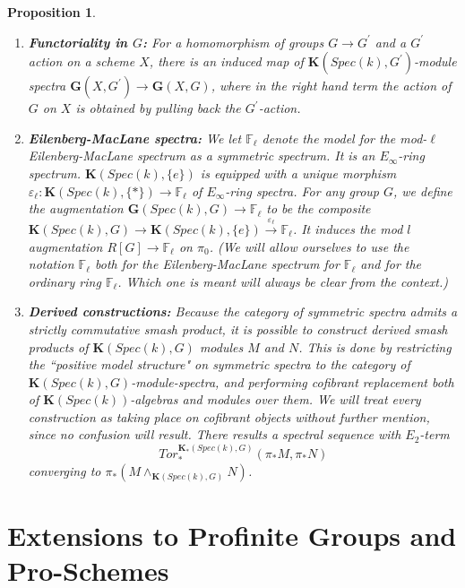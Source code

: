 \documentclass[11pt]{article}
\newcommand\mb{\mathbb}
\def \bK{\mathbf K}
\newcommand\mfk{\mathbf G}
\newtheorem{Proposition}{Proposition}[section]
\begin{document}
\begin{Proposition}
\begin{enumerate}[label=(\arabic*), font=\upshape]
    \item{{\bf Functoriality in $G$:} For a homomorphism of groups $G \rightarrow G^{\prime}$ and a $G^{\prime}$ action on a scheme $X$, there is an induced map of $\bK(Spec(k),G^{\prime})$-module spectra $\mfk(X, G^{\prime}) \rightarrow \mfk(X, G)$, where in the right hand term the action of $G$ on $X$ is obtained by pulling back the $G^{\prime}$-action.  } 
    \item{{\bf Eilenberg-MacLane spectra:} We let $\mb{F}_{\ell}$ denote the model for the mod-$\ell$ Eilenberg-MacLane spectrum as a symmetric spectrum.  It is an $E_{\infty}$-ring spectrum.   $\bK (Spec(k), \{e\} ) $ is equipped with a unique morphism $\varepsilon _{\ell}:\bK(Spec(k), \{*\}) \rightarrow \mb{F}_{\ell}$ of $E_{\infty}$-ring spectra. For any group $G$, we define the augmentation $\mfk(Spec(k), G) \rightarrow \mb{F}_{\ell}$ to be the composite $\bK(Spec(k), G) \rightarrow \bK(Spec(k), \{ e \}) \xrightarrow{\varepsilon _{\ell}} \mb{F}_{\ell}$. It induces the mod $l$ augmentation $R[G] \rightarrow \mb{F}_{\ell}$  on $\pi _0$. (We will allow ourselves to use the notation $\mb{F}_{\ell}$ both for the Eilenberg-MacLane spectrum for $\mb{F}_{\ell}$ and  for the ordinary ring $\mb{F}_{\ell}$. Which one  is meant will always be clear from the context.) }
    \item{{\bf Derived constructions:}  Because the category of symmetric spectra  admits a strictly commutative smash  product, it is possible to construct derived smash products of $\bK(Spec(k), G)$ modules $M$ and $N$. This is done by restricting the ``positive  model structure" on symmetric spectra to the category of  $\bK(Spec(k), G)$-module-spectra, and performing cofibrant replacement both of $\bK(Spec(k))$-algebras and modules over them.  We will treat every construction as taking place on cofibrant objects without further mention, since no confusion will result.    There results  a spectral sequence with $E_2$-term 
    $$Tor_*^{\bK_*(Spec(k), G)}(\pi _*M,\pi _*N) 
    $$
    converging to $\pi _* (M  \wedge _{\bK(Spec(k), G)} N )$. }
\end{enumerate}
    
\end{Proposition}
\section{Extensions to Profinite Groups and Pro-Schemes}\label{extensions}
\end{document}
